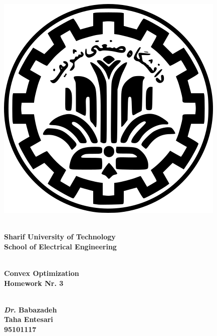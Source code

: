 \documentclass[a4paper]{article}
\begin{document}
\begin{center}
	\vspace{2cm}
	\includegraphics[scale=.35]{logo1.png}\\
	\vspace{0.5cm}
	\begin{Large}
	\textbf{
	\\Sharif University of Technology
	\vspace{0.5cm}
	\\School of Electrical Engineering
	}
	\end{Large}
	\vspace{2cm}
	\begin{huge}
	\textbf{
	\\Convex Optimization
	\vspace{0.75cm}
‍
	\\Homework Nr. 3
	}
	\end{huge}
	\vspace{2cm}
	\begin{Large}
	\textbf{
	\\\textit{Dr}. Babazadeh
	\vspace{2cm}
	\\Taha Entesari
	\vspace{0.75cm}
	\\95101117
	}
	\end{Large}
	
\end{center}
\end{document}

